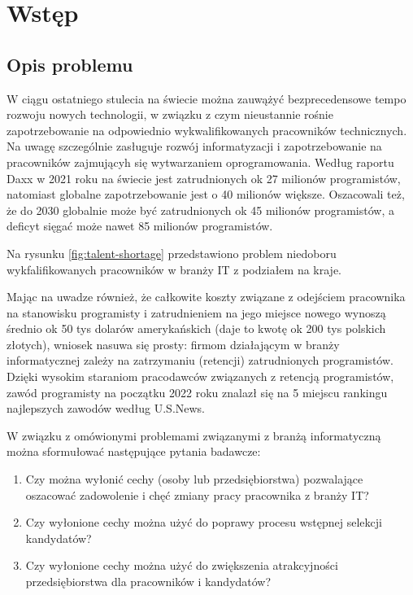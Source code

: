 
\chapter*{Wstęp}\label{ch:admission}

\section*{Opis problemu}\label{sec:admission:problem-description}

W ciągu ostatniego stulecia na świecie można zauwążyć bezprecedensowe tempo rozwoju nowych technologii,
w związku z czym nieustannie rośnie zapotrzebowanie na odpowiednio wykwalifikowanych pracowników technicznych.
Na uwagę szczególnie zasługuje rozwój informatyzacji i zapotrzebowanie na pracowników zajmującyh się wytwarzaniem oprogramowania.
Według raportu Daxx w 2021 roku na świecie jest zatrudnionych ok 27 milionów programistów, natomiast globalne zapotrzebowanie jest o 40 milionów większe.
Oszacowali też, że do 2030 globalnie może być zatrudnionych ok 45 milionów programistów, a deficyt sięgać może nawet 85 milionów programistów.

Na rysunku \ref{fig:talent-shortage} przedstawiono problem niedoboru wykfalifikowanych pracowników w branży IT z podziałem na kraje.


Mając na uwadze również, że całkowite koszty związane z odejściem pracownika na stanowisku programisty i zatrudnieniem na jego miejsce nowego
wynoszą średnio ok 50 tys dolarów amerykańskich (daje to kwotę ok 200 tys polskich złotych), wniosek nasuwa się prosty:
firmom działającym w branży informatycznej zależy na zatrzymaniu (retencji) zatrudnionych programistów.
Dzięki wysokim staraniom pracodawców związanych z retencją programistów,
zawód programisty na początku 2022 roku znalazł się na 5 miejscu rankingu najlepszych zawodów według U.S.News.

W związku z omówionymi problemami związanymi z branżą informatyczną można sformułować następujące pytania badawcze:
\begin{enumerate}
    \item Czy można wyłonić cechy (osoby lub przedsiębiorstwa) pozwalające oszacować zadowolenie i chęć zmiany pracy pracownika z branży IT?
    \item Czy wyłonione cechy można użyć do poprawy procesu wstępnej selekcji kandydatów?
    \item Czy wyłonione cechy można użyć do zwiększenia atrakcyjności przedsiębiorstwa dla pracowników i kandydatów?
\end{enumerate}

